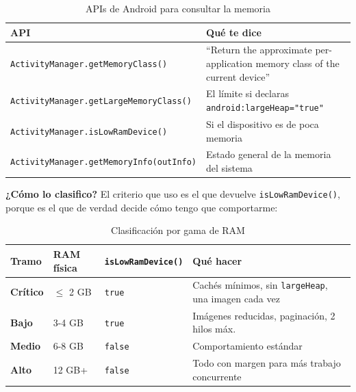 \documentclass[11pt,a4paper]{article}
\newcommand{\code}[1]{\texttt{\color{ink}#1}}
\newcommand{\campo}[1]{\textbf{\color{ink}#1}}
\begin{document}
	\begin{table}[htbp]
		\centering
		\small
		\begin{tabularx}{\textwidth}{@{}>{\RaggedRight\arraybackslash}p{6cm} >{\RaggedRight\arraybackslash}X@{}}
			\toprule
			\rowcolor{primary}
			\textcolor{paper}{\sffamily\bfseries API} & \textcolor{paper}{\sffamily\bfseries Qué te dice} \\
			\midrule
			\code{ActivityManager.getMemoryClass()} & \enquote{Return the approximate per-application memory class of the current device} \\
			\rowcolor{soft}
			\code{ActivityManager.getLargeMemoryClass()} & El límite si declaras \code{android:largeHeap="true"} \\
			\code{ActivityManager.isLowRamDevice()} & Si el dispositivo es de poca memoria \\
			\rowcolor{soft}
			\code{ActivityManager.getMemoryInfo(outInfo)} & Estado general de la memoria del sistema \\
			\bottomrule
		\end{tabularx}
		\caption{APIs de Android para consultar la memoria}
	\end{table}
	
	\campo{¿Cómo lo clasifico?}
	El criterio que uso es el que devuelve \code{isLowRamDevice()}, porque es el que de verdad decide cómo tengo que comportarme:
	
	\begin{table}[htbp]
		\centering
		\small
		\begin{tabularx}{\textwidth}{@{}l l l >{\RaggedRight\arraybackslash}X@{}}
			\toprule
			\rowcolor{primary}
			\textcolor{paper}{\sffamily\bfseries Tramo} & \textcolor{paper}{\sffamily\bfseries RAM física} & \textcolor{paper}{\sffamily\bfseries \code{isLowRamDevice()}} & \textcolor{paper}{\sffamily\bfseries Qué hacer} \\
			\midrule
			\textbf{Crítico} & $\leq$ 2 GB & \code{true} & Cachés mínimos, sin \code{largeHeap}, una imagen cada vez \\
			\rowcolor{soft}
			\textbf{Bajo} & 3-4 GB & \code{true} & Imágenes reducidas, paginación, 2 hilos máx. \\
			\textbf{Medio} & 6-8 GB & \code{false} & Comportamiento estándar \\
			\rowcolor{soft}
			\textbf{Alto} & 12 GB+ & \code{false} & Todo con margen para más trabajo concurrente \\
			\bottomrule
		\end{tabularx}
		\caption{Clasificación por gama de RAM}
	\end{table}
	
\end{document}
